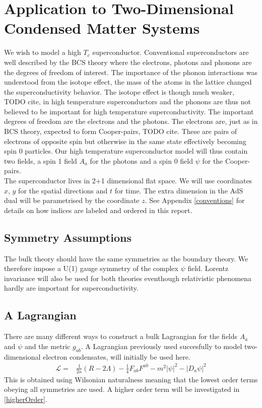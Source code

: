 \documentclass[12pt]{report}
\begin{document}
\chapter{Application to Two-Dimensional Condensed Matter Systems}
We wish to model a high $T_c$ superconductor. Conventional superconductors are well described by the BCS theory where the electrons, photons and phonons are the degrees of freedom of interest. The importance of the phonon interactions was understood from the isotope effect, the mass of the atoms in the lattice changed the superconductivity behavior. The isotope effect is though much weaker, TODO cite, in high temperature superconductors and the phonons are thus not believed to be important for high temperature superconductivity. The important degrees of freedom are the electrons and the photons. The electrons are, just as in BCS theory, expected to form Cooper-pairs, TODO cite. These are pairs of electrons of opposite spin but otherwise in the same state effectively becoming spin 0 particles. Our high temperature superconductor model will thus contain two fields, a spin 1 field $A_a$ for the photons and a spin 0 field $\psi$ for the Cooper-pairs.\\

The superconductor lives in 2+1 dimensional flat space. We will use coordinates $x$, $y$ for the spatial directions and $t$ for time. The extra dimension in the AdS dual will be parametrised by the coordinate $z$. See Appendix \ref{conventions} for details on how indices are labeled and ordered in this report. 
\section{Symmetry Assumptions}
The bulk theory should have the same symmetries as the boundary theory. We therefore impose a U(1) gauge symmetry of the complex $\psi$ field. Lorentz invariance will also be used for both theories eventhough relativistic phenomena hardly are important for superconductivity.

\section{A Lagrangian}
There are many different ways to construct a bulk Lagrangian for the fields $A_a$ and  $\psi$ and the metric $g_{ab}$. A Lagrangian previously used succesfully to model two-dimensional electron condensates\cite{hartnoll9},\cite{horowitz} will initially be used here.
\begin{eqnarray}
 \mathcal{L}=&\frac{1}{2\kappa}\left(R-2\Lambda\right)-\frac{1}{4}F_{ab}F^{ab}-m^2|\psi|^2-|D_a\psi|^2
\label{L}
\end{eqnarray}
This is obtained using Wilsonian naturalness meaning that the lowest order terms obeying all symmetries are used. A higher order term will be investigated in \ref{higherOrder}.\\
\end{document}
